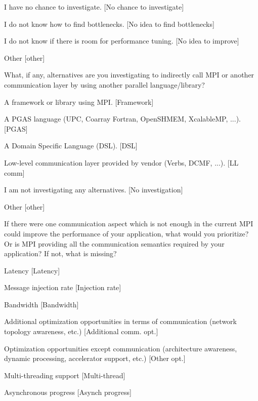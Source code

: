 \documentclass[preprint,5p,times]{elsarticle}
\begin{document}
{\begin{description}
\begin{inparaenum}
    \item I have no chance to investigate.
      [No chance to investigate]
    \item I do not know how to find bottlenecks.
      [No idea to find bottlenecks]
    \item I do not know if there is room for performance tuning.
      [No idea to improve]
    \item Other [other]
    \end{inparaenum}
  \item[Q24*:] What, if any, alternatives are you investigating to
    indirectly call MPI or another communication layer by using another
    parallel language/library?
    \begin{inparaenum}[{\bf C}1)]
    \item A framework or library using MPI. [Framework]
    \item A PGAS language (UPC, Coarray Fortran, OpenSHMEM, XcalableMP,
      ...). [PGAS]
    \item A Domain Specific Language (DSL). [DSL]
    \item Low-level communication layer provided by vendor (Verbs, DCMF,
      ...). [LL comm]
    \item I am not investigating any alternatives. [No investigation]
    \item Other [other]
    \end{inparaenum}
  \item[Q25:] If there were one communication aspect which is not enough
    in the current MPI could improve the performance of your application,
    what would you prioritize? Or is MPI providing all the communication
    semantics required by your application? If not, what is missing?
    \begin{inparaenum}[{\bf C}1)]
    \item Latency [Latency]
    \item Message injection rate [Injection rate]
    \item Bandwidth [Bandwidth]
    \item Additional optimization opportunities in terms of communication
      (network topology awareness, etc.) [Additional comm. opt.]
    \item Optimization opportunities except communication (architecture
      awareness, dynamic processing, accelerator support, etc.) [Other opt.]
    \item Multi-threading support [Multi-thread]
    \item Asynchronous progress [Asynch progress]

\end{inparaenum}
\end{description}}
\end{document}

